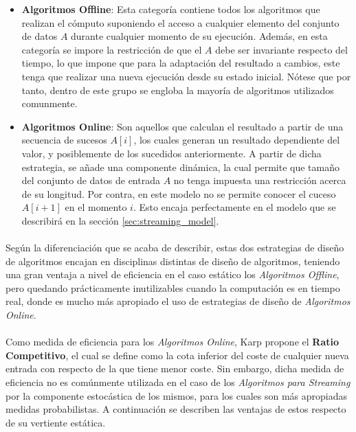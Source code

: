 \documentclass{subfiles}
\begin{document}
        \begin{itemize}
          \item \textbf{Algoritmos Offline}: Esta categoría contiene todos los algoritmos que realizan el cómputo suponiendo el acceso a cualquier elemento del conjunto de datos $A$ durante cualquier momento de su ejecución. Además, en esta categoría se impore la restricción de que el $A$ debe ser invariante respecto del tiempo, lo que impone que para la adaptación del resultado a cambios, este tenga que realizar una nueva ejecución desde su estado inicial. Nótese que por tanto, dentro de este grupo se engloba la mayoría de algoritmos utilizados comunmente.

          \item \textbf{Algoritmos Online}: Son aquellos que calculan el resultado a partir de una secuencia de sucesos $A[i]$, los cuales generan un resultado dependiente del valor, y posiblemente de los sucedidos anteriormente. A partir de dicha estrategia, se añade una componente dinámica, la cual permite que tamaño del conjunto de datos de entrada $A$ no tenga impuesta una restricción acerca de su longitud. Por contra, en este modelo no se permite conocer el cuceso $A[i+1]$ en el momento $i$.  Esto encaja perfectamente en el modelo que se describirá en la sección \ref{sec:streaming_model}.

        \end{itemize}

        \paragraph{}
        Según la diferenciación que se acaba de describir, estas dos estrategias de diseño de algoritmos encajan en disciplinas distintas de diseño de algoritmos, teniendo una gran ventaja a nivel de eficiencia en el caso estático los \emph{Algoritmos Offline}, pero quedando prácticamente inutilizables cuando la computación es en tiempo real, donde es mucho más apropiado el uso de estrategias de diseño de \emph{Algoritmos Online}.

        \paragraph{}
        Como medida de eficiencia para los \emph{Algoritmos Online}, Karp \cite{Karp:1992:OAV:645569.659725} propone el \textbf{Ratio Competitivo}, el cual se define como la cota inferior del coste de cualquier nueva entrada con respecto de la que tiene menor coste. Sin embargo, dicha medida de eficiencia no es comúnmente utilizada en el caso de los \emph{Algoritmos para Streaming} por la componente estocástica de los mismos, para los cuales son más apropiadas medidas probabilistas. A continuación se describen las ventajas de estos respecto de su vertiente estática.
\end{document}
